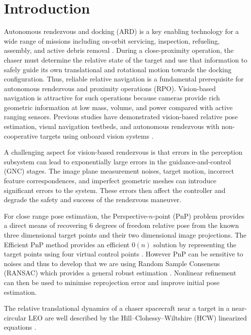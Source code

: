\section{Introduction}
Autonomous rendezvous and docking (ARD) is a key enabling technology for a wide range of missions including on-orbit servicing, inspection, refueling, assembly, and active debris removal \cite{fehse2003rendezvous,flores2014}. During a close-proximity operation, the chaser must determine the relative state of the target and use that information to safely guide its own translational and rotational motion towards the docking configuration. Thus, reliable relative navigation is a fundamental prerequisite for autonomous rendezvous and proximity operations (RPO). Vision-based navigation is attractive for such operations because cameras provide rich geometric information at low mass, volume, and power compared with active ranging sensors. Previous studies have demonstrated vision-based relative pose estimation, visual navigation testbeds, and autonomous rendezvous with non-cooperative targets using onboard vision systems \cite{kelsey2006,testbed2014,gaias2018avanti}.

A challenging aspect for vision-based rendezvous is that errors in the perception subsystem can lead to exponentially large errors in the guidance-and-control (GNC) stages. The image plane measurement noises, target motion, incorrect feature correspondences, and imperfect geometric meshes can introduce significant errors to the system. These errors then affect the controller and degrade the safety and success of the rendezvous maneuver. 

For close range pose estimation, the Perspective-$n$-point (PnP) problem provides a direct means of recovering 6 degrees of freedom relative pose from the known three dimensional target points and their two dimensional image projections. The Efficient PnP method provides an efficient $0(n)$ solution by representing the target points using four virtual control points \cite{lepetit2009epnp}. However PnP can be sensitive to noises and thus to develop that we are using Random Sample Consensus (RANSAC) which provides a general robust estimation \cite{fischler1981ransac}. Nonlinear refinement can then be used to minimise reprojection error and improve initial pose estimation.

The relative translational dynamics of a chaser spacecraft near a target in a near-circular LEO are well described by the Hill--Clohessy--Wiltshire (HCW) linearized equations \cite{clohessy1960}. 

